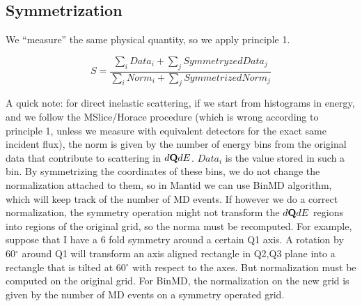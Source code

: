 \documentclass{article}
\begin{document}
\subsection{Symmetrization}
We ``measure'' the same physical quantity, so we apply principle 1.

\begin{equation}
S=\frac{\sum_{i} Data_i +\sum_j SymmetryzedData_j}{\sum_{i} Norm_i + \sum_j SymmetrizedNorm_j}
\end{equation}

A quick note: for direct inelastic scattering, if we start from histograms in energy, and we follow the MSlice/Horace procedure (which is wrong according to principle 1, unless we measure with equivalent detectors for the exact same incident flux), the norm is given by the number of energy bins from the original data that contribute to scattering in $d{\bf Q} dE$. $Data_i$ is the value stored in such a bin. By symmetrizing the coordinates of these bins, we do not change the normalization attached to them, so in Mantid we can use BinMD algorithm, which will keep track of the number of MD events. If however we do a correct normalization, the symmetry operation might not transform the $d{\bf Q} dE$ regions into regions of the original grid, so the norma must be recomputed. For example, suppose that I have a 6 fold symmetry around a certain Q1 axis. A rotation by 60$^\circ$ around Q1 will transform an axis aligned rectangle in Q2,Q3 plane into a rectangle that is tilted at 60$^\circ$ with respect to the axes. But normalization must be computed on the original grid. For BinMD, the normalization on the new grid is given by the number of MD events on a symmetry operated grid.   
\end{document}
